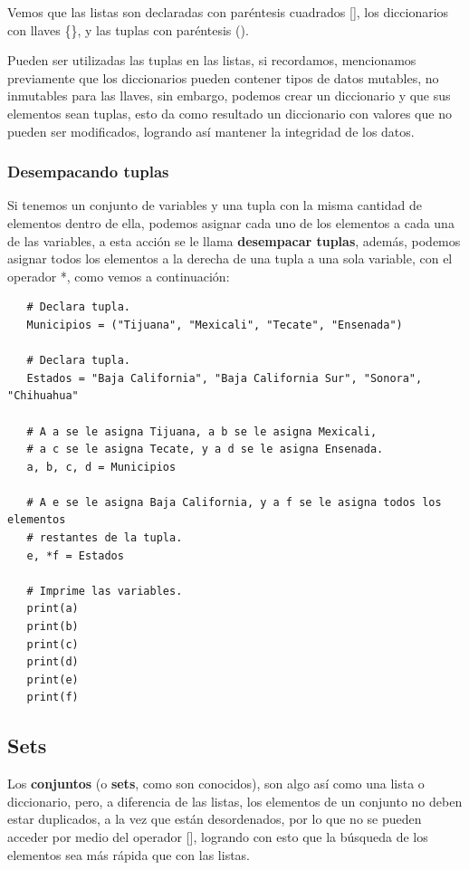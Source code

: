 Vemos que las listas son declaradas con paréntesis cuadrados [], los diccionarios con llaves \{\}, y las tuplas con paréntesis ().

Pueden ser utilizadas las tuplas en las listas, si recordamos, mencionamos previamente que los diccionarios pueden contener tipos de datos mutables, no inmutables para las llaves, sin embargo, podemos crear un diccionario y que sus elementos sean tuplas, esto da como resultado un diccionario con valores que no pueden ser modificados, logrando así mantener la integridad de los datos.


\subsubsection{Desempacando tuplas}
\hspace{0.55cm}Si tenemos un conjunto de variables y una tupla con la misma cantidad de elementos dentro de ella, podemos asignar cada uno de los elementos a cada una de las variables, a esta acción se le llama \textbf{desempacar tuplas}, además, podemos asignar todos los elementos a la derecha de una tupla a una sola variable, con el operador *, como vemos a continuación:
\begin{lstlisting}
   # Declara tupla.
   Municipios = ("Tijuana", "Mexicali", "Tecate", "Ensenada")
   
   # Declara tupla.
   Estados = "Baja California", "Baja California Sur", "Sonora", "Chihuahua"
   
   # A a se le asigna Tijuana, a b se le asigna Mexicali,
   # a c se le asigna Tecate, y a d se le asigna Ensenada.
   a, b, c, d = Municipios
   
   # A e se le asigna Baja California, y a f se le asigna todos los elementos
   # restantes de la tupla.   
   e, *f = Estados   
   
   # Imprime las variables.
   print(a)
   print(b)
   print(c)
   print(d)
   print(e)
   print(f)
\end{lstlisting}


\subsection{Sets}
\hspace{0.55cm}Los \textbf{conjuntos} (o \textbf{sets}, como son conocidos), son algo así como una lista o diccionario, pero, a diferencia de las listas, los elementos de un conjunto no deben estar duplicados, a la vez que están desordenados, por lo que no se pueden acceder por medio del operador [], logrando con esto que la búsqueda de los elementos sea más rápida que con las listas.


